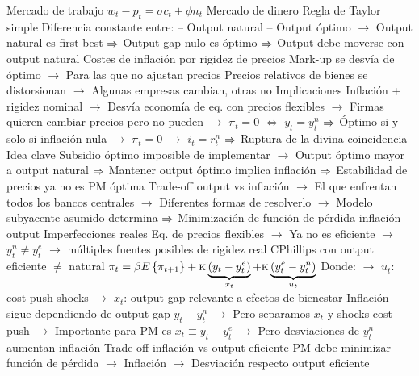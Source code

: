 \documentclass{nuevotema}
\begin{document}
\begin{esquemal}
				\4[WS] Mercado de trabajo
				\4[] $w_t - p_t = \sigma c_t + \phi n_t$
				\4[MP] Mercado de dinero
				\4[] 
				\4[TR] Regla de Taylor simple
				\4[] 
				\4 Diferencia constante entre:
				\4[] -- Output natural
				\4[] -- Output óptimo
				\4[] $\to$ Output natural es first-best
				\4[] $\Rightarrow$ Output gap nulo es óptimo
				\4[] $\Rightarrow$ Output debe moverse con output natural
				\4 Costes de inflación por rigidez de precios
				\4[] Mark-up se desvía de óptimo
				\4[] $\to$ Para las que no ajustan precios
				\4[] Precios relativos de bienes se distorsionan
				\4[] $\to$ Algunas empresas cambian, otras no
				\4 Implicaciones
				\4[] Inflación + rigidez nominal
				\4[] $\to$ Desvía economía de eq. con precios flexibles
				\4[] $\to$ Firmas quieren cambiar precios pero no pueden
				\4[] $\to$ $\pi_t = 0$ $\iff$ $y_t = y_t^n$
				\4[] $\Rightarrow$ Óptimo si y solo si inflación nula
				\4[] $\to$ $\pi_t = 0$
				\4[] $\to$ $i_t = r_t^n$
				\4[] $\Rightarrow$ 
			\3 Ruptura de la divina coincidencia
				\4 Idea clave
				\4[] Subsidio óptimo imposible de implementar
				\4[] $\to$ Output óptimo mayor a output natural
				\4[] $\Rightarrow$ Mantener output óptimo implica inflación
				\4[] $\Rightarrow$ Estabilidad de precios ya no es PM óptima
				\4[] Trade-off output vs inflación
				\4[] $\to$ El que enfrentan todos los bancos centrales
				\4[] $\to$ Diferentes formas de resolverlo
				\4[] $\to$ Modelo subyacente asumido determina
				\4[] $\Rightarrow$ Minimización de función de pérdida inflación-output
				\4 Imperfecciones reales
				\4[] Eq. de precios flexibles
				\4[] $\to$ Ya no es eficiente
				\4[] $\to$ $y_t^n \neq y_t^e$
				\4[] $\to$ múltiples fuentes posibles de rigidez real
				\4[NKPC'] CPhillips con output eficiente $\neq$ natural
				\4[] $\pi_t = \beta E\left\lbrace \pi_{t+1} \right\rbrace + \textsc{k} \underbrace{(y_t - y_t^e)}_{x_t}+ \textsc{k} \underbrace{(y_t^e - y_t^n)}_{u_t}$
				\4[] Donde:
				\4[] $\to$ $u_t$: cost-push shocks
				\4[] $\to$ $x_t$: output gap relevante a efectos de bienestar
				\4[] Inflación sigue dependiendo de output gap $y_t - y_t^n$
				\4[] $\to$ Pero separamos $x_t$ y shocks cost-push
				\4[] $\to$ Importante para PM es $x_t \equiv y_t - y_t^e$
				\4[] $\to$ Pero desviaciones de $y_t^n$ aumentan inflación
				\4 Trade-off inflación vs output eficiente
				\4[] PM debe minimizar función de pérdida
				\4[] $\to$ Inflación
				\4[] $\to$ Desviación respecto output eficiente

\end{esquemal}
\end{document}
